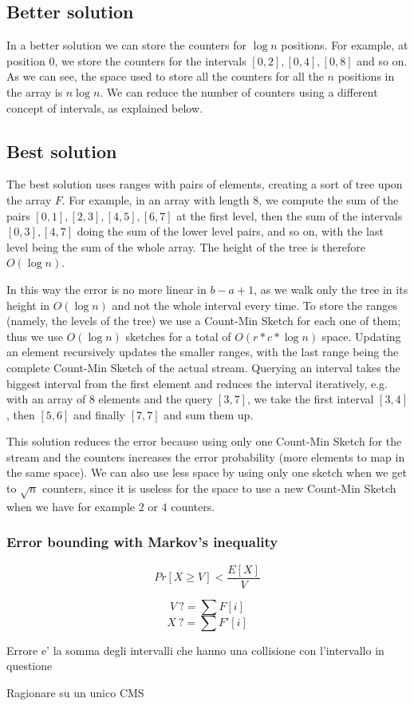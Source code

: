 \documentclass{article}
\begin{document}
\subsection{Better solution}
In a better solution we can store the counters for $\log n$ positions. For example, at position $0$, we store the counters for the intervals $[0,2],[0,4],[0,8]$ and so on. As we can see, the space used to store all the counters for all the $n$ positions in the array is $n\log n$. We can reduce the number of counters using a different concept of intervals, as explained below.

\subsection{Best solution}
The best solution uses ranges with pairs of elements, creating a sort of tree upon the array $F$. For example, in an array with length $8$, we compute the sum of the pairs $[0,1],[2,3],[4,5],[6,7]$ at the first level, then the sum of the intervals $[0,3],[4,7]$ doing the sum of the lower level pairs, and so on, with the last level being the sum of the whole array. The height of the tree is therefore $O(\log n)$.

In this way the error is no more linear in $b-a+1$, as we walk only the tree in its height in $O(\log n)$ and not the whole interval every time. To store the ranges (namely, the levels of the tree) we use a Count-Min Sketch for each one of them; thus we use $O(\log n)$ sketches for a total of $O(r * c * \log n)$ space. Updating an element recursively updates the smaller ranges, with the last range being the complete Count-Min Sketch of the actual stream. Querying an interval takes the biggest interval from the first element and reduces the interval iteratively, e.g. with an array of $8$ elements and the query $[3,7]$, we take the first interval $[3,4]$, then $[5,6]$ and finally $[7,7]$ and sum them up.

This solution reduces the error because using only one Count-Min Sketch for the stream and the counters increases the error probability (more elements to map in the same space). We can also use less space by using only one sketch when we get to $\sqrt n$ counters, since it is useless for the space to use a new Count-Min Sketch when we have for example $2$ or $4$ counters.

\subsubsection{Error bounding with Markov's inequality}
$$Pr[X\geq V]<\frac{E[X]}{V}$$

$$V\ ?=\sum F[i]$$
$$X\ ?=\sum F'[i]$$

Errore e' la somma degli intervalli che hanno una collisione con l'intervallo in questione

Ragionare su un unico CMS
\end{document}

